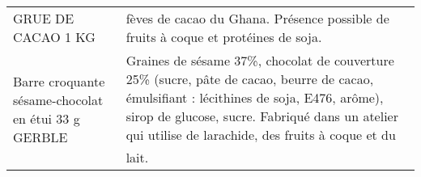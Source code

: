 \begin{longtable}{p{5cm}p{10cm}}
                                                                                       GRUE DE CACAO 1 KG &                                                                                                                                                                                                                                                                                                                                                                                                                                                                                                                                                                                                                                                                                                                                                                                                                                                                                                                                                       fèves de cacao du Ghana. Présence possible de fruits à coque et protéines de soja. \\
                                                      Barre croquante sésame-chocolat en étui 33 g GERBLE &                                                                                                                                                                                                                                                                                                                                                                                                                                                                                                                                                                                                                                                                                                                                                                                   Graines de sésame 37\%, chocolat de couverture 25\% (sucre, pâte de cacao, beurre de cacao, émulsifiant : lécithines de soja, E476, arôme), sirop de glucose, sucre.  Fabriqué dans un atelier qui utilise de larachide, des fruits à coque et du lait. \\

\end{longtable}
